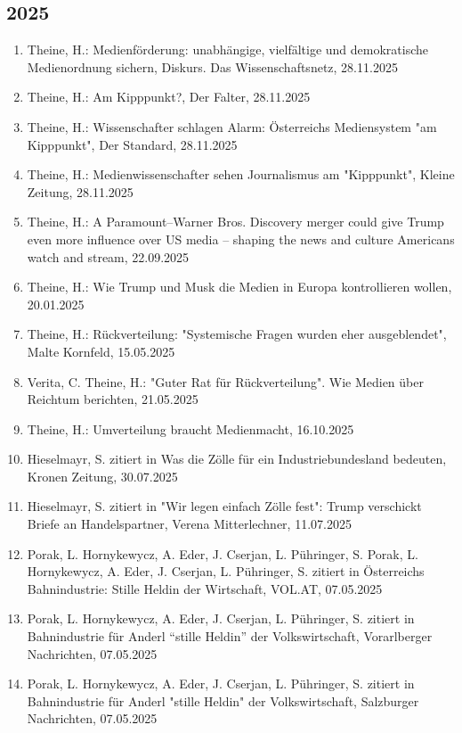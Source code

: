 \subsection*{2025}
\begin{enumerate}
	 \item Theine, H.: Medienförderung: unabhängige, vielfältige und demokratische Medienordnung sichern, Diskurs. Das Wissenschaftsnetz, 28.11.2025
	 \item Theine, H.: Am Kipppunkt?, Der Falter, 28.11.2025
	 \item Theine, H.: Wissenschafter schlagen Alarm: Österreichs Mediensystem "am Kipppunkt", Der Standard, 28.11.2025
	 \item Theine, H.: Medienwissenschafter sehen Journalismus am "Kipppunkt", Kleine Zeitung, 28.11.2025
	 \item Theine, H.: A Paramount–Warner Bros. Discovery merger could give Trump even more influence over US media – shaping the news and culture Americans watch and stream, 22.09.2025
	 \item Theine, H.: Wie Trump und Musk die Medien in Europa kontrollieren wollen, 20.01.2025
	 \item Theine, H.: Rückverteilung: "Systemische Fragen wurden eher ausgeblendet", Malte Kornfeld, 15.05.2025
	 \item Verita, C. Theine, H.: "Guter Rat für Rückverteilung". Wie Medien über Reichtum berichten, 21.05.2025
	 \item Theine, H.: Umverteilung braucht Medienmacht, 16.10.2025
	 \item Hieselmayr, S. zitiert in Was die Zölle für ein Industriebundesland bedeuten, Kronen Zeitung, 30.07.2025
	 \item Hieselmayr, S. zitiert in "Wir legen einfach Zölle fest": Trump verschickt Briefe an Handelspartner, Verena Mitterlechner, 11.07.2025
	 \item Porak, L. Hornykewycz, A. Eder, J. Cserjan, L. Pühringer, S. Porak, L. Hornykewycz, A. Eder, J. Cserjan, L. Pühringer, S. zitiert in Österreichs Bahnindustrie: Stille Heldin der Wirtschaft, VOL.AT, 07.05.2025
	 \item Porak, L. Hornykewycz, A. Eder, J. Cserjan, L. Pühringer, S. zitiert in Bahnindustrie für Anderl “stille Heldin” der Volkswirtschaft, Vorarlberger Nachrichten, 07.05.2025
	 \item Porak, L. Hornykewycz, A. Eder, J. Cserjan, L. Pühringer, S. zitiert in Bahnindustrie für Anderl "stille Heldin" der Volkswirtschaft, Salzburger Nachrichten, 07.05.2025

\end{enumerate}

